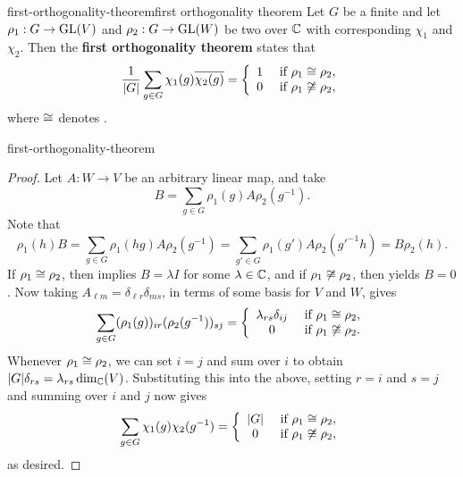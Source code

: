 \begin{topic}{first-orthogonality-theorem}{first orthogonality theorem}
    Let $G$ be a finite  and let $\rho_1 : G \to \textup{GL}(V)$ and $\rho_2 : G \to \textup{GL}(W)$ be two  over $\mathbb{C}$ with corresponding  $\chi_1$ and $\chi_2$. Then the \textbf{first orthogonality theorem} states that
    \[ \frac{1}{|G|} \sum_{g \in G} \chi_1(g) \overline{\chi_2(g)} = \left\{ \begin{array}{cl} 1 & \textup{ if } \rho_1 \cong \rho_2 , \\ 0 & \textup{ if } \rho_1 \not\cong \rho_2 , \end{array} \right. \]
    where $\cong$ denotes .
\end{topic}

\begin{example}{first-orthogonality-theorem}
    \begin{proof}
        Let $A : W \to V$ be an arbitrary linear map, and take
        \[ B = \sum_{g \in G} \rho_1(g) A \rho_2(g^{-1}) . \]
        Note that
        \[ \rho_1(h) B = \sum_{g \in G} \rho_1(hg) A \rho_2(g^{-1}) = \sum_{g' \in G} \rho_1(g') A \rho_2(g'^{-1} h) = B \rho_2(h) . \]
        If $\rho_1 \cong \rho_2$, then  implies $B = \lambda I$ for some $\lambda \in \mathbb{C}$, and if $\rho_1 \not\cong \rho_2$, then  yields $B = 0$. Now taking $A_{\ell m} = \delta_{\ell r} \delta_{ms}$, in terms of some basis for $V$ and $W$, gives
        \[ \sum_{g \in G} (\rho_1(g))_{ir} (\rho_2(g^{-1}))_{sj} = \left\{ \begin{array}{cl} \lambda_{rs} \delta_{ij} & \textup{ if } \rho_1 \cong \rho_2 , \\ 0 & \textup{ if } \rho_1 \not\cong \rho_2 . \end{array} \right. \]
        Whenever $\rho_1 \cong \rho_2$, we can set $i = j$ and sum over $i$ to obtain $|G| \delta_{rs} = \lambda_{rs} \dim_{\mathbb{C}}(V)$. Substituting this into the above, setting $r = i$ and $s = j$ and summing over $i$ and $j$ now gives
        \[ \sum_{g \in G} \chi_1(g) \chi_2(g^{-1}) = \left\{ \begin{array}{cl} |G| & \textup{ if } \rho_1 \cong \rho_2 , \\ 0 & \textup{ if } \rho_1 \not\cong \rho_2 , \end{array} \right. \]
        as desired.
    \end{proof}
\end{example}

